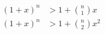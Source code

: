    \begin{align*}
      {(1+x)}^n &> 1+{ n \choose 1}x \\
      {(1+x)}^n &> 1+  { n \choose 2}x^{2}
   \end{align*}
